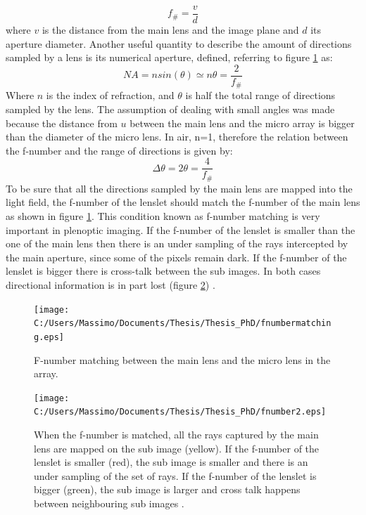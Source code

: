\begin{equation}
\label{eq:f_num}
f_{\#} = \dfrac{v}{d}
\end{equation} 
where $v$ is the distance from the main lens and the image plane and $d$ its aperture diameter. Another useful quantity to describe the amount of directions sampled by a lens is its numerical aperture, defined, referring to figure \ref{fig:plenoptic5} as:
\begin{equation}
\label{eq:NA}
NA=n sin(\theta)\simeq n \theta =\dfrac{2}{f_{\#}}
\end{equation}
Where $n$ is the index of refraction, and $\theta$ is half the total range of directions sampled by the lens. The assumption of dealing with small angles was made because the distance from $u$ between the main lens and the micro array is bigger than the diameter of the micro lens. In air, n=1, therefore the relation between the f-number and the range of directions is given by:
\begin{equation}
\label{eq:fnum1}
\Delta\theta= 2\theta=\dfrac{4}{f_{\#}}
\end{equation}
 To be sure that all the directions sampled by the main lens are mapped into the light field, the f-number of the lenslet should match the f-number of the main lens \cite{ng2005light} as shown in figure \ref{fig:plenoptic5}. This condition known as f-number matching is very important in plenoptic imaging. If the f-number of the lenslet is smaller than the one of the main lens then there is an under sampling of the rays intercepted by the main aperture, since some of the pixels remain dark. If the f-number of the lenslet is bigger there is cross-talk between the sub images. In both cases directional information is in part lost (figure \ref{fig:plenoptic7}) .
\begin{figure}[H]
	\centering
	\texttt{[image: C:/Users/Massimo/Documents/Thesis/Thesis\_PhD/fnumbermatching.eps]}
	\caption{\label{fig:plenoptic5}F-number matching between the main lens and the micro lens in the array.  }
\end{figure}
\begin{figure}[H]
	\centering
	\texttt{[image: C:/Users/Massimo/Documents/Thesis/Thesis\_PhD/fnumber2.eps]}
	\caption{\label{fig:plenoptic7}When the f-number is matched, all the rays captured by the main lens are mapped on the sub image (yellow). If the f-number of the lenslet is smaller (red), the sub image is smaller and there is an under sampling of the set of rays. If the f-number of the lenslet is bigger (green), the sub image is larger and cross talk happens between neighbouring sub images .  }
\end{figure}
\newpage
